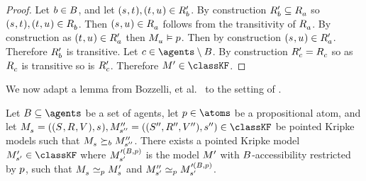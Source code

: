 \begin{proof}
Let $\agentB \in \agentsB$, and let $(\kStateS, \kStateT), (\kStateT, \kStateU) \in \kAccessibilityPB$.
By construction $\kAccessibilityPB \subseteq \kAccessibilityA$ so $(\kStateS, \kStateT), (\kStateT, \kStateU) \in \kAccessibilityB$.
Then $(\kStateS, \kStateU) \in \kAccessibilityA$ follows from the transitivity of $\kAccessibilityA$.
By construction as $(\kStateT, \kStateU) \in \kAccessibilityPA$ then $\kPModel{\kStateU} \entails \atomP$.
Then by construction $(\kStateS, \kStateU) \in \kAccessibilityPA$.
Therefore $\kAccessibilityPB$ is transitive.
Let $\agentC \in \agents \setminus \agentsB$.
By construction $\kAccessibilityPC = \kAccessibilityC$ so as $\kAccessibilityC$ is transitive so is $\kAccessibilityPC$.
Therefore $\kModelP \in \classKF$.
\end{proof}

We now adapt a lemma from Bozzelli, et al.~\cite{bozzelli:2014b} to the setting of \classKF{}.

\begin{lemma}\label{rml-k4-refinement-p-bisimulation}
Let $\agentsB \subseteq \agents$ be a set of agents, let $\atomP \in \atoms$ be a propositional atom, and let $\kPModelAndTuple{\kStateS}, \kPModelAndTuplePP{\kStateSPP} \in \classKF$ be pointed Kripke models such that $\kPModel{\kStateS} \simulatesB \kPModelPP{\kStateSPP}$.
There exists a pointed Kripke model $\kPModelP{\kStateSP} \in \classKF$ where $\kPModel[\prime(\agentsB, \atomP)]{\kStateSP}$ is the model $\kModelP$ with $\agentsB$-accessibility restricted by $\atomP$, such that $\kPModel{\kStateS} \bisimilar[\atomP] \kPModelP{\kStateS}$ and $\kPModelPP{\kStateSP} \bisimilar[\atomP] \kPModel[\prime(\agentsB, \atomP)]{\kStateSP}$.
\end{lemma}

